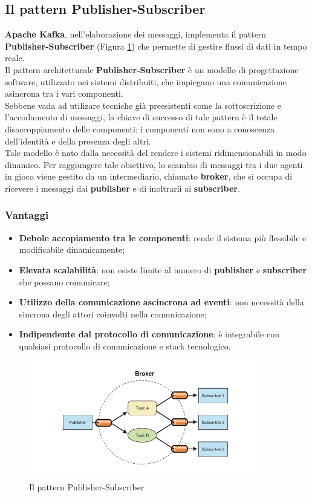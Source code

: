 \subsection{Il pattern Publisher-Subscriber}
\textbf{Apache Kafka}, nell'elaborazione dei messaggi, implementa il pattern \textbf{Publisher-Subscriber} (Figura \ref{fig:publisher_subscriber}) che permette di gestire flussi di dati in tempo reale.\\
Il pattern architetturale \textbf{Publisher-Subscriber} è un modello di progettazione software, utilizzato nei sistemi distribuiti, che impiegano una comunicazione asincrona tra i vari componenti.\\
Sebbene vada ad utilizare tecniche già preesistenti come la sottoscrizione e l'accodamento di messaggi, la  chiave di successo di tale pattern è il totale disaccoppiamento delle componenti: i componenti non sono a conoscenza dell'identità e della presenza degli altri.\\
Tale modello è nato dalla necessità del rendere i sistemi ridimensionabili in modo dinamico. Per raggiungere tale obiettivo, lo scambio di messaggi 
tra i due agenti in gioco viene gestito da un intermediario, chiamato \textbf{broker}, che si occupa di ricevere i messaggi dai \textbf{publisher} e di inoltrarli ai \textbf{subscriber}.\\
\subsubsection{Vantaggi}
\begin{itemize}
    \item \textbf{Debole accopiamento tra le componenti}:  rende il sistema più flessibile e modificabile dinamicamente;
    \item \textbf{Elevata scalabilità}: non esiste limite al numero di \textbf{publisher} e \textbf{subscriber} che possano comunicare;
    \item \textbf{Utilizzo della comunicazione ascincrona ad eventi}: non necessità della sincrona degli attori coinvolti nella comunicazione;
    \item \textbf{Indipendente dal protocollo di comunicazione}: è integrabile con qualsiasi protocollo di comunicazione e stack tecnologico.
\end{itemize}
\begin{figure}[h]
    \centering
    \includegraphics[width=0.9\textwidth]{images/componenti/ps-model.png}
    \caption{Il pattern Publisher-Subscriber}
    \label{fig:publisher_subscriber}
\end{figure}
\pagebreak
